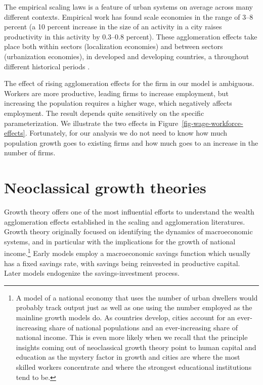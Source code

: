 The empirical \glspl{scaling law} is a feature of urban systems on average across many different contexts.  Empirical work has found %
scale economies in the range of 3--8 percent (a 10 percent increase in the size of an activity in a city raises productivity in this activity by 0.3--0.8 percent). These agglomeration effects take place both within sectors (localization economies) and between sectors (urbanization economies),  in developed and developing countries, a throughout different historical periods \cite{bettencourtIntroductionUrbanScience2021}. %

The effect of rising agglomeration effects for the firm in our model is ambiguous. Workers are more productive, leading firms to increase employment, but increasing the population requires a higher wage, which negatively affects employment. The result depends quite sensitively on the specific parameterization. We illustrate the two effects in Figure~\ref{fig-wage-workforce-effects}. Fortunately, for our analysis we do not need to know how much population growth goes to existing firms and how much goes to an increase in the number of firms.


\section{Neoclassical growth theories}  \label{section-growth}

Growth theory offers one of the most influential efforts to understand the wealth agglomeration effects established in the scaling and agglomeration literatures.  Growth theory originally focused on identifying the dynamics of macroeconomic systems, and in particular with the implications for the growth of national income.\footnote{A model of a national economy that uses the number of urban dwellers would probably track output just as well as one using the number employed as the mainline growth models do. As countries develop, cities account for an ever-increasing share of national populations and an ever-increasing share of national income.  This is even more likely when we recall that the principle insights coming out of neoclassical growth theory point to human capital and education as the mystery factor in growth and cities are where the most skilled workers concentrate and where the strongest educational institutions tend to be.}  Early models \cite{keynesGeneralTheoryEmployment1937, harrodEssayDynamicTheory1939, domarCapitalExpansionRate1946}  employ a macroeconomic savings function which usually has a fixed savings rate, with savings being reinvested in productive capital. Later models endogenize the savings-investment process. 

